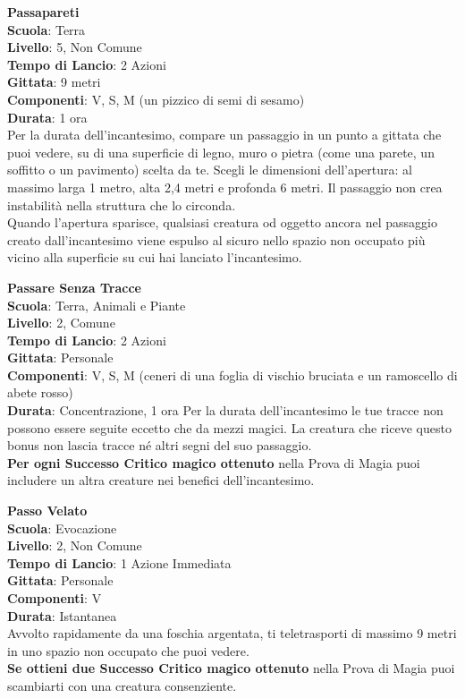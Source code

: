 \begin{multicols}{2}
\medskip\textbf{Passapareti}\\
\textbf{Scuola}: Terra\\
\textbf{Livello}: 5, Non Comune\\
\textbf{Tempo di Lancio}: 2 Azioni\\
\textbf{Gittata}: 9 metri\\
\textbf{Componenti}: V, S, M (un pizzico di semi di sesamo)\\
\textbf{Durata}: 1 ora\\
Per la durata dell'incantesimo, compare un passaggio in un punto a gittata che puoi vedere, su di una superficie di legno, muro o pietra (come una parete, un soffitto o un pavimento) scelta da te. Scegli le dimensioni dell'apertura: al massimo larga 1 metro, alta 2,4 metri e profonda 6 metri. Il passaggio non crea instabilità nella struttura che lo circonda.\\
Quando l'apertura sparisce, qualsiasi creatura od oggetto ancora nel passaggio creato dall'incantesimo viene espulso al sicuro nello spazio non occupato più vicino alla superficie su cui hai lanciato l'incantesimo.

\medskip\textbf{Passare Senza Tracce}\\
\textbf{Scuola}: Terra, Animali e Piante\\
\textbf{Livello}: 2, Comune\\
\textbf{Tempo di Lancio}: 2 Azioni\\
\textbf{Gittata}: Personale\\
\textbf{Componenti}: V, S, M (ceneri di una foglia di vischio bruciata e un ramoscello di abete rosso)\\
\textbf{Durata}: Concentrazione, 1 ora
Per la durata dell'incantesimo le tue tracce non possono essere seguite eccetto che da mezzi magici. La creatura che riceve questo bonus non lascia tracce né altri segni del suo passaggio.\\
\textbf{Per ogni Successo Critico magico ottenuto} nella Prova di Magia puoi includere un altra creature nei benefici dell'incantesimo.

\medskip\textbf{Passo Velato}\\
\textbf{Scuola}: Evocazione\\
\textbf{Livello}: 2, Non Comune\\
\textbf{Tempo di Lancio}: 1 Azione Immediata\\
\textbf{Gittata}: Personale\\
\textbf{Componenti}: V\\
\textbf{Durata}: Istantanea\\
Avvolto rapidamente da una foschia argentata, ti teletrasporti di massimo 9 metri in uno spazio non occupato che puoi vedere.\\
\textbf{Se ottieni due Successo Critico magico ottenuto} nella Prova di Magia puoi scambiarti con una creatura consenziente.


\end{multicols}
